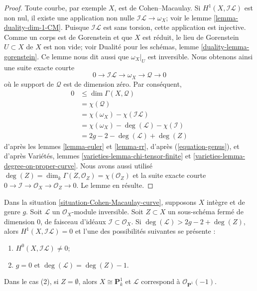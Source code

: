 \begin{proof}
Toute courbe, par exemple $X$, est de Cohen--Macaulay. Si $H^1(X, \mathcal{I}\mathcal{L})$ est non nul, il existe une application non nulle $\mathcal{I}\mathcal{L} \to \omega_X$; voir le lemme \ref{lemma-duality-dim-1-CM}. Puisque $\mathcal{I}\mathcal{L}$ est sans torsion, cette application est injective. Comme un corps est de Gorenstein et que $X$ est réduit, le lieu de Gorenstein $U \subset X$ de $X$ est non vide; voir Dualité pour les schémas, lemme \ref{duality-lemma-gorenstein}. Ce lemme nous dit aussi que $\omega_X|_U$ est inversible. Nous obtenons ainsi une suite exacte courte $$
0 \to \mathcal{I}\mathcal{L} \to \omega_X \to \mathcal{Q} \to 0
$$ où le support de $\mathcal{Q}$ est de dimension zéro. Par conséquent, \begin{align*}
0 & \leq \dim \Gamma(X, \mathcal{Q})\\
& =
\chi(\mathcal{Q}) \\
& =
\chi(\omega_X) - \chi(\mathcal{I}\mathcal{L}) \\
& =
\chi(\omega_X) - \deg(\mathcal{L}) - \chi(\mathcal{I}) \\
& =
2g - 2 - \deg(\mathcal{L}) + \deg(Z)
\end{align*} d'après les lemmes \ref{lemma-euler} et \ref{lemma-rr}, d'après (\ref{equation-genus}), et d'après Variétés, lemmes \ref{varieties-lemma-chi-tensor-finite} et \ref{varieties-lemma-degree-on-proper-curve}. Nous avons aussi utilisé $\deg(Z) = \dim_k \Gamma(Z, \mathcal{O}_Z) = \chi(\mathcal{O}_Z)$ et la suite exacte courte $0 \to \mathcal{I} \to \mathcal{O}_X \to \mathcal{O}_Z \to 0$. Le lemme en résulte.
\end{proof}

\begin{lemma}
\label{lemma-degree-more-than-2g-2}
\begin{reference}
\cite[Lemma 2]{Jongmin}
\end{reference}
Dans la situation \ref{situation-Cohen-Macaulay-curve}, supposons $X$ intègre et de genre $g$. Soit $\mathcal{L}$ un $\mathcal{O}_X$-module inversible. Soit $Z \subset X$ un sous-schéma fermé de dimension $0$, de faisceau d'idéaux $\mathcal{I} \subset \mathcal{O}_X$. Si $\deg(\mathcal{L}) > 2g - 2 + \deg(Z)$, alors $H^1(X, \mathcal{I}\mathcal{L}) = 0$ et l'une des possibilités suivantes se présente :
\begin{enumerate}
\item $H^0(X, \mathcal{I}\mathcal{L}) \not = 0$;
\item $g = 0$ et $\deg(\mathcal{L}) = \deg(Z) - 1$.
\end{enumerate}
Dans le cas (2), si $Z = \emptyset$, alors $X \cong \mathbf{P}^1_k$ et $\mathcal{L}$ correspond à $\mathcal{O}_{\mathbf{P}^1}(-1)$.
\end{lemma}

